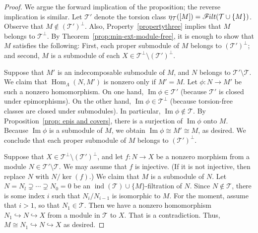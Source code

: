 \documentclass[ALCO,ThmDefs,Unicode,epreuves]{cedram}
\DeclareMathOperator{\image}{Im}
\DeclareMathOperator{\Hom}{Hom}
\DeclareMathOperator{\ind}{ind}
\newcommand{\calT}{\mathcal{T}}
\newcommand{\filt}{\mathscr{F}\Mk ilt}
\renewcommand{\1}{\hat{1}}
\newcommand{\0}{\hat{0}}
\newcommand*{\Mk}{\mkern -2mu}
\begin{document}
\begin{proof}
We argue the forward implication of the proposition; the reverse implication is similar. 
Let $\calT'$ denote the torsion class $\eta_\calT([M])=\filt(\calT \cup \{M\})$.
Observe that $M\not\in (\calT')^\perp$.
Also, Property~\ref{propertythree} implies that $M$ belongs to $\calT^\perp$.
By Theorem~\ref{prop:min-ext-module-free}, it is enough to show that $M$ satisfies the following:
First, each proper submodule of $M$ belongs to $(\calT')^\perp$; and second, $M$ is a submodule of each $X\in \calT^\perp \setminus (\calT')^\perp$.

Suppose that $M'$ is an indecomposable submodule of $M$, and $N$ belongs to $\calT'\setminus \calT$.
We claim that $\Hom_\Lambda(N, M')$ is nonzero only if $M'=M$.
Let $\phi: N\rightarrow M'$ be such a nonzero homomorphism.
On one hand, $\image \phi \in \calT'$ (because $\calT'$ is closed under epimorphisms).
On the other hand, $\image\phi \in \calT^\perp$ (because torsion-free classes are closed under submodules).
In particular, $\image\phi\not\in \calT$.
By Proposition~\ref{prop: epis and covers}, there is a surjection of $\image \phi$ onto $M$.
Because $\image\phi$ is a submodule of $M$, we obtain $\image\phi\cong M'\cong M$, as desired.
We conclude that each proper submodule of $M$ belongs to
$(\calT')^\perp$.

Suppose that $X\in \calT^\perp \setminus (\calT')^\perp$, and let $f: N\to X$ be a nonzero morphism from a module $N\in \calT'\setminus \calT$.
We may assume that $f$ is injective.
(If it is not injective, then replace $N$ with $N/\ker(f)$.)
We claim that $M$ is a submodule of $N$. 
Let $N=N_l \supsetneq \cdots
 \supsetneq N_0=0$ be an $\ind(\calT)\cup \{M\}$-filtration of $N$.
Since $N\notin \calT$, there is some index $i$ such that $N_i/N_{i-1}$ is isomorphic to $M$.
For the moment, assume that $i>1$, so that $N_1\in \calT$.
Then we have a nonzero homomorphism $N_1\hookrightarrow N \hookrightarrow X$ from a module in $\calT$ to $X$.
That is a contradiction.
Thus, $M\cong N_1 \hookrightarrow N \hookrightarrow X$ as desired.
\end{proof}
\end{document}

